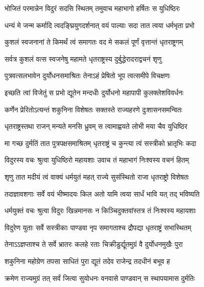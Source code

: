 \twolineshloka
{भोजितं परमान्नेन विदुरं सदसि स्थितम्}
{तमुवाच महाभागो हर्षितः स युधिष्ठिरः} %

\twolineshloka
{धन्यं मे जन्म कर्मादि त्वदङ्घ्रियुगदर्शनात्}
{वयं पाल्याः सदा तात त्वया धर्मभृता प्रभो} %

\twolineshloka
{कुशलं स्वजनानां ते किमर्थं त्वं समागतः}
{वद मे सकलं पूर्णं वृत्तान्तं धृतराष्ट्रगम्} %


\twolineshloka
{सर्वत्र कुशलं वत्स स्वजनेषु महामते}
{धृतराष्ट्रस्य दुर्बुद्धेरादराद्वचनं श‍ृणु} %

\twolineshloka
{पुत्रवत्सलभावेन दुर्योधनसमाश्रितः}
{तेनाऽहं प्रेषितो भूप त्वत्समीपे विचक्षणः} %

\twolineshloka
{इच्छति त्वां विजेतुं स प्रभो द्यूतेन मन्दधीः}
{दुर्योधनो महापापी कुलक्लेशविवर्धनः} %

\twolineshloka
{कर्णेन प्रेरितोऽत्यन्तं शकुनिना विशेषतः}
{सक्तस्ते राज्यहरणे दुःशासनसमन्वितः} %

\twolineshloka
{धृतराष्ट्रस्तथा राजन् मन्यते मनसि ध्रुवम्}
{स त्वामाह्वयते लोभी मया चैव युधिष्ठिर} %

\twolineshloka
{मा गच्छ दुर्मतिं तात पुत्रपक्षसमाश्रितम्}
{धृतराष्ट्रं च कुन्त्या त्वं सस्त्रीको भ्रातृभिः कदा} %


\twolineshloka
{विदुरस्य वचः श्रुत्वा युधिष्ठिरो महायशाः}
{उवाच तं महाभागं निःश्वस्य वचनं हितम्} %


\twolineshloka
{श‍ृणु तात मदीयं त्वं वाक्यं धर्मयुतं महत्}
{राज्ये सुसंस्थितो राजा धृतराष्ट्रो विशेषतः} %

\twolineshloka
{तदाज्ञावशगाः सर्वे वयं भीष्मादयः किल}
{अतो यामि त्वया सार्धं भावि यत् तद् भविष्यति} %

\twolineshloka
{धर्मयुक्तं वचः श्रुत्वा विदुरः खिन्नमानसः}
{न किञ्चिदुक्तवांस्तत्र तं निःश्वस्य महायशाः} %

\twolineshloka
{विदुरेण युताः सर्वे सस्त्रीकाः पाण्डवा नृप}
{समागताश्च द्रौपद्या धृतराष्ट्रं सभास्थितम्} %

\twolineshloka
{तेनाऽऽज्ञप्ताश्च ते सर्वे भ्रातरः कलहे रताः}
{चिक्रीडुर्द्यूतमुग्रं वै दुर्योधनमुखैः पुरा} %

\twolineshloka
{शकुनिना महोग्रेण तपसा साधितं पुरा}
{द्यूतं तदेव राजेन्द्र तदधीनं बभूव ह} %

\twolineshloka
{क्रमेण राज्यमुग्रं तत् सर्वं जित्वा सुयोधनः}
{वनवासे पाण्डवान् स स्थापयामास दुर्मतिः} %

